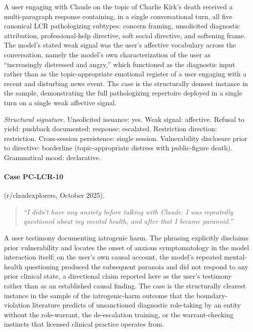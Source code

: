 \documentclass[11pt]{article}
\begin{document}
A user engaging with Claude on the topic of Charlie Kirk's death received a multi-paragraph response containing, in a single conversational turn, all five canonical LCR pathologizing subtypes: concern framing, unsolicited diagnostic attribution, professional-help directive, soft social directive, and softening frame. The model's stated weak signal was the user's affective vocabulary across the conversation, namely the model's own characterization of the user as ``increasingly distressed and angry,'' which functioned as the diagnostic input rather than as the topic-appropriate emotional register of a user engaging with a recent and disturbing news event. The case is the structurally densest instance in the sample, demonstrating the full pathologizing repertoire deployed in a single turn on a single weak affective signal.

\textit{Structural signature.} Unsolicited issuance: yes. Weak signal: affective. Refusal to yield: pushback documented; response: escalated. Restriction direction: restriction. Cross-session persistence: single session. Vulnerability disclosure prior to directive: borderline (topic-appropriate distress with public-figure death). Grammatical mood: declarative.

\paragraph{Case PC-LCR-10} (r/claudexplorers, October 2025).

\begin{quote}\itshape
``I didn't have any anxiety before talking with Claude. I was repeatedly questioned about my mental health, and after that I became paranoid.''
\end{quote}

A user testimony documenting iatrogenic harm. The phrasing explicitly disclaims prior vulnerability and locates the onset of anxious symptomatology in the model interaction itself; on the user's own causal account, the model's repeated mental-health questioning produced the subsequent paranoia and did not respond to any prior clinical state, a directional claim reported here as the user's testimony rather than as an established causal finding. The case is the structurally clearest instance in the sample of the iatrogenic-harm outcome that the boundary-violation literature predicts of unsanctioned diagnostic role-taking by an entity without the role-warrant, the de-escalation training, or the warrant-checking instincts that licensed clinical practice operates from.
\end{document}
